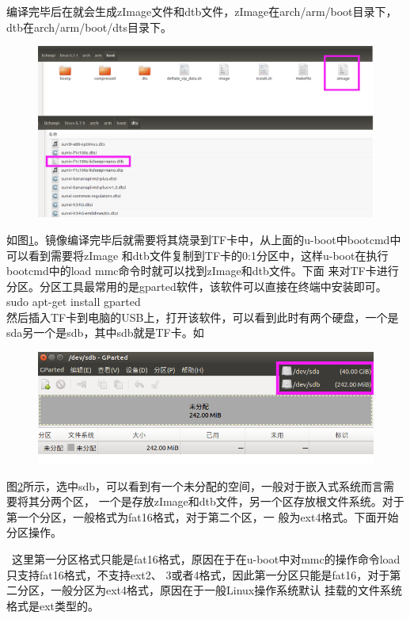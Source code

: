 编译完毕后在就会生成zImage文件和dtb文件，zImage在arch/arm/boot目录下，dtb在arch/arm/boot/dts目录下。
\begin{figure}[htbp]
	\centering
	\includegraphics[width=1\linewidth]{chapter2/img/zImagepng}
	\caption{}
	\label{fig:zimagepng}
\end{figure}
如图\ref{fig:zimagepng}。镜像编译完毕后就需要将其烧录到TF卡中，从上面的u-boot中bootcmd中可以看到需要将zImage
和dtb文件复制到TF卡的0:1分区中，这样u-boot在执行bootcmd中的load mmc命令时就可以找到zImage和dtb文件。下面
来对TF卡进行分区。分区工具最常用的是gparted软件，该软件可以直接在终端中安装即可。\\
sudo apt-get install gparted\\
然后插入TF卡到电脑的USB上，打开该软件，可以看到此时有两个硬盘，一个是sda另一个是sdb，其中sdb就是TF卡。如
\begin{figure}[htbp]
	\centering
	\includegraphics[width=1\linewidth]{chapter2/img/gpartedpng}
	\caption{}
	\label{fig:gpartedpng}
\end{figure}
图\ref{fig:gpartedpng}所示，选中sdb，可以看到有一个未分配的空间，一般对于嵌入式系统而言需要将其分两个区，
一个是存放zImage和dtb文件，另一个区存放根文件系统。对于第一个分区，一般格式为fat16格式，对于第二个区，一
般为ext4格式。下面开始分区操作。
\begin{tcolorbox}[colback=red!5!white,colframe=red!75!black]
	\faWarning\  
	这里第一分区格式只能是fat16格式，原因在于在u-boot中对mmc的操作命令load只支持fat16格式，不支持ext2、
	3或者4格式，因此第一分区只能是fat16，对于第二分区，一般分区为ext4格式，原因在于一般Linux操作系统默认
	挂载的文件系统格式是ext类型的。
\end{tcolorbox}


